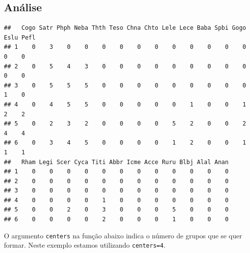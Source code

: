 \documentclass[
]{book}
\newenvironment{Shaded}{\begin{snugshade}}{\end{snugshade}}
\newcommand{\CommentTok}[1]{\textcolor[rgb]{0.56,0.35,0.01}{\textit{#1}}}
\newcommand{\DecValTok}[1]{\textcolor[rgb]{0.00,0.00,0.81}{#1}}
\newcommand{\KeywordTok}[1]{\textcolor[rgb]{0.13,0.29,0.53}{\textbf{#1}}}
\newcommand{\NormalTok}[1]{#1}
\newcommand{\OperatorTok}[1]{\textcolor[rgb]{0.81,0.36,0.00}{\textbf{#1}}}
\newcommand{\StringTok}[1]{\textcolor[rgb]{0.31,0.60,0.02}{#1}}
\begin{document}
\hypertarget{anuxe1lise-1}{%
\subsection{Análise}\label{anuxe1lise-1}}

\begin{Shaded}
\end{Shaded}

\begin{verbatim}
##   Cogo Satr Phph Neba Thth Teso Chna Chto Lele Lece Baba Spbi Gogo Eslu Pefl
## 1    0    3    0    0    0    0    0    0    0    0    0    0    0    0    0
## 2    0    5    4    3    0    0    0    0    0    0    0    0    0    0    0
## 3    0    5    5    5    0    0    0    0    0    0    0    0    0    1    0
## 4    0    4    5    5    0    0    0    0    0    1    0    0    1    2    2
## 5    0    2    3    2    0    0    0    0    5    2    0    0    2    4    4
## 6    0    3    4    5    0    0    0    0    1    2    0    0    1    1    1
##   Rham Legi Scer Cyca Titi Abbr Icme Acce Ruru Blbj Alal Anan
## 1    0    0    0    0    0    0    0    0    0    0    0    0
## 2    0    0    0    0    0    0    0    0    0    0    0    0
## 3    0    0    0    0    0    0    0    0    0    0    0    0
## 4    0    0    0    0    1    0    0    0    0    0    0    0
## 5    0    0    2    0    3    0    0    0    5    0    0    0
## 6    0    0    0    0    2    0    0    0    1    0    0    0
\end{verbatim}

\begin{Shaded}
\end{Shaded}

O argumento \texttt{centers} na função abaixo indica o número de grupos que se quer formar. Neste exemplo estamos utilizando \texttt{centers=4}.
\end{document}
